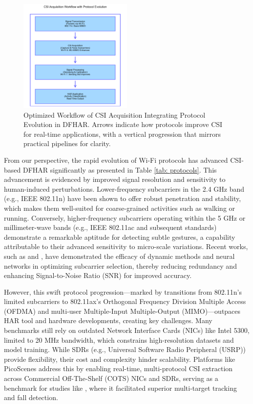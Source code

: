 \documentclass[Afour,sageh,times]{sagej}
\begin{document}
\begin{figure}[htbp]
\centering
\includegraphics[width=0.5\textwidth]{5.CSI workflow.png}
\caption{Optimized Workflow of CSI Acquisition Integrating Protocol Evolution in DFHAR. Arrows indicate how protocols improve CSI for real-time applications, with a vertical progression that mirrors practical pipelines for clarity.}
\label{fig:optimized_csi_workflow}
\end{figure}

From our perspective, the rapid evolution of Wi-Fi protocols has advanced CSI-based DFHAR significantly as presented in Table \ref{tab: protocols}. This advancement is evidenced by improved signal resolution and sensitivity to human-induced perturbations. Lower-frequency subcarriers in the 2.4 GHz band (e.g., IEEE 802.11n) have been shown to offer robust penetration and stability, which makes them well-suited for coarse-grained activities such as walking or running. Conversely, higher-frequency subcarriers operating within the 5 GHz or millimeter-wave bands (e.g., IEEE 802.11ac and subsequent standards) demonstrate a remarkable aptitude for detecting subtle gestures, a capability attributable to their advanced sensitivity to micro-scale variations. Recent works, such as \citep{jiang2021eliminating} and \citep{pegoraro2023rapid}, have demonstrated the efficacy of dynamic methods and neural networks in optimizing subcarrier selection, thereby reducing redundancy and enhancing Signal-to-Noise Ratio (SNR) for improved accuracy.

However, this swift protocol progression—marked by transitions from 802.11n's limited subcarriers to 802.11ax's Orthogonal Frequency Division Multiple Access (OFDMA) and multi-user Multiple-Input Multiple-Output (MIMO)—outpaces HAR tool and hardware developments, creating key challenges. Many benchmarks still rely on outdated Network Interface Cards (NICs) like Intel 5300, limited to 20 MHz bandwidth, which constrains high-resolution datasets and model training. While SDRs (e.g., Universal Software Radio Peripheral (USRP)) provide flexibility, their cost and complexity hinder scalability. Platforms like PicoScenes \citep{jiang2021eliminating} address this by enabling real-time, multi-protocol CSI extraction across  Commercial Off-The-Shelf (COTS) NICs and SDRs, serving as a benchmark for studies like \citep{zhou2022target}, where it facilitated superior multi-target tracking and fall detection.
\end{document}
